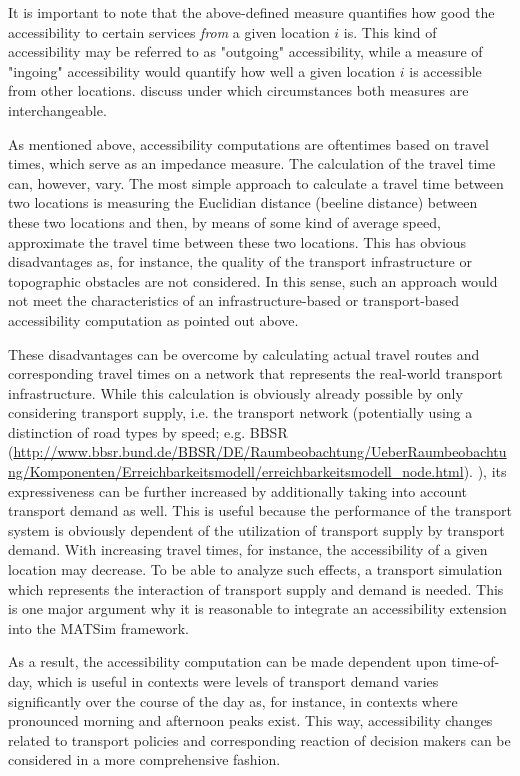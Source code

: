 It is important to note that the above-defined measure quantifies how good the accessibility to certain services \textit{from} a given location $i$ is. This kind of accessibility may be referred to as "outgoing" accessibility, while a measure of "ingoing" accessibility would quantify how well a given location $i$ is accessible from other locations. \citet{NicolaiNagel2012HiResAccessibilityMethodInBook} discuss under which circumstances both measures are interchangeable.

As mentioned above, accessibility computations are oftentimes based on travel times, which serve as an impedance measure. The calculation of the travel time can, however, vary. The most simple approach to calculate a travel time between two locations is measuring the Euclidian distance (beeline distance) between these two locations and then, by means of some kind of average speed, approximate the travel time between these two locations. This has obvious disadvantages as, for instance, the quality of the transport infrastructure or topographic obstacles are not considered. In this sense, such an approach would not meet the characteristics of an {in\-fra\-struc\-ture-based} or transport-based accessibility computation as pointed out above.

These disadvantages can be overcome by calculating actual travel routes and corresponding travel times on a network that represents the real-world transport infrastructure. While this calculation is obviously already possible by only considering transport supply, i.e. the transport network (potentially using a distinction of road types by speed; e.g. BBSR (\url{http://www.bbsr.bund.de/BBSR/DE/Raumbeobachtung/UeberRaumbeobachtung/Komponenten/Erreichbarkeitsmodell/erreichbarkeitsmodell_node.html}). ), its expressiveness can be further increased by additionally taking into account transport demand as well. This is useful because the performance of the transport system is obviously dependent of the utilization of transport supply by transport demand. With increasing travel times, for instance, the accessibility of a given location may decrease. To be able to analyze such effects, a transport simulation which represents the interaction of transport supply and demand is needed. This is one major argument why it is reasonable to integrate an accessibility extension into the MATSim framework.

As a result, the accessibility computation can be made dependent upon time-of-day, which is useful in contexts were levels of transport demand varies significantly over the course of the day as, for instance, in contexts where pronounced morning and afternoon peaks exist. This way, accessibility changes related to transport policies and corresponding reaction of decision makers can be considered in a more comprehensive fashion.

